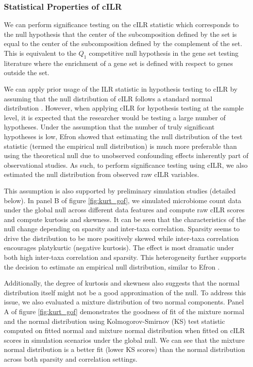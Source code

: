 \documentclass[10pt,letterpaper]{article}
\begin{document}
\subsubsection*{Statistical Properties of cILR}
We can perform significance testing on the cILR statistic which corresponds to the null hypothesis that the center of the subcomposition defined by the set is equal to the center of the subcomposition defined by the complement of the set. This is equivalent to the $Q_1$ competitive null hypothesis in the gene set testing literature \cite{tian2005} where the enrichment of a gene set is defined with respect to genes outside the set. 

We can apply prior usage of the ILR statistic in hypothesis testing to cILR by assuming that the null distribution of cILR follows a standard normal distribution \cite{egozcue2005}. However, when applying cILR for hypothesis testing at the sample level, it is expected that the researcher would be testing a large number of hypotheses. Under the assumption that the number of truly significant hypotheses is low, Efron \cite{efron2004} showed that estimating the null distribution of the test statistic (termed the empirical null distribution) is much more preferable than using the theoretical null due to unobserved confounding effects inherently part of observational studies. As such, to perform significance testing using cILR, we also estimated the null distribution from observed raw cILR variables. 

This assumption is also supported by preliminary simulation studies (detailed below). In panel B of figure \ref{fig:kurt_gof}, we simulated microbiome count data under the global null across different data features and compute raw cILR scores and compute kurtosis and skewness. It can be seen that the characteristics of the null change depending on sparsity and inter-taxa correlation. Sparsity seems to drive the distribution to be more positively skewed while inter-taxa correlation encourages platykurtic (negative kurtosis). The effect is most dramatic under both high inter-taxa correlation and sparsity. This heterogeneity further supports the decision to estimate an empirical null distribution, similar to Efron \cite{efron2004}. 

Additionally, the degree of kurtosis and skewness also suggests that the normal distribution itself might not be a good approximation of the null. To address this issue, we also evaluated a mixture distribution of two normal components. Panel A of figure \ref{fig:kurt_gof} demonstrates the goodness of fit of the mixture normal and the normal distribution using Kolmogorov-Smirnov (KS) test statistic computed on fitted normal and mixture normal distribution when fitted on cILR scores in simulation scenarios under the global null. We can see that the mixture normal distribution is a better fit (lower KS scores) than the normal distribution across both sparsity and correlation settings. 
\end{document}
